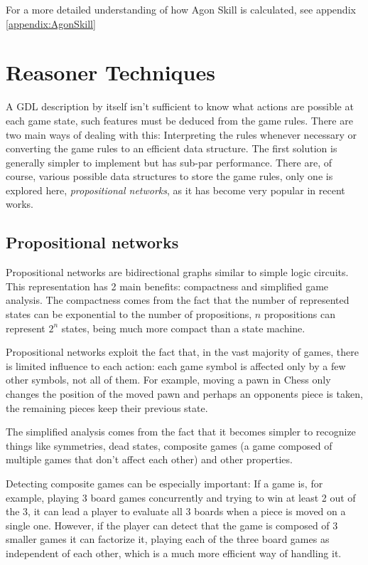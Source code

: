 For a more detailed understanding of how Agon Skill is calculated, see appendix \ref{appendix:AgonSkill}


\section{Reasoner Techniques}
A \gls{GDL} description by itself isn't sufficient to know what actions are possible at each game state, such features must be deduced from the game rules.
There are two main ways of dealing with this:
Interpreting the rules whenever necessary or converting the game rules to an efficient data structure. The first solution is generally simpler to implement but has sub-par performance. There are, of course, various possible data structures to store the game rules, only one is explored here, \textit{propositional networks}, as it has become very popular in recent works.


\subsection{Propositional networks}

Propositional networks are bidirectional graphs similar to simple logic circuits.
This representation has 2 main benefits: compactness and simplified game analysis.
The compactness comes from the fact that the number of represented states can be exponential to the number of propositions, $n$ propositions can represent $2^{n}$ states, being much more compact than a state machine.

Propositional networks exploit the fact that, in the vast majority of games, there is limited influence to each action: each game symbol is affected only by a few other symbols, not all of them. For example, moving a pawn in Chess only changes the position of the moved pawn and perhaps an opponents piece is taken, the remaining pieces keep their previous state.

The simplified analysis comes from the fact that it becomes simpler to recognize things like symmetries, dead states, composite games (a game composed of multiple games that don't affect each other) and other properties. 

Detecting composite games can be especially important: If a game is, for example, playing 3 board games concurrently and trying to win at least 2 out of the 3, it can lead a player to evaluate all 3 boards when a piece is moved on a single one. However, if the player can detect that the game is composed of 3 smaller games it can factorize it, playing each of the three board games as independent of each other, which is a much more efficient way of handling it.

